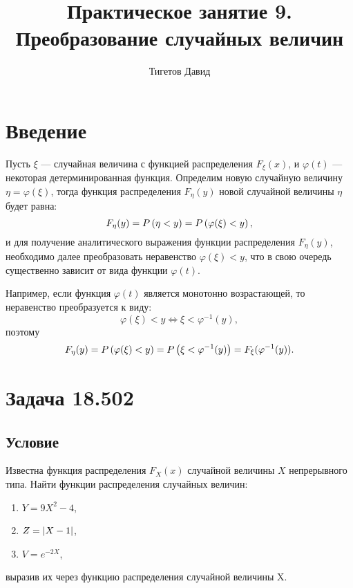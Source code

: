 \documentclass[12pt,a4paper]{article}
\begin{document}
    \title{Практическое занятие 9. \\ Преобразование случайных величин}
    \author{Тигетов Давид}
    \maketitle


    \section{Введение}
    Пусть $\xi$ --- случайная величина с функцией распределения $F_\xi(x)$, и $\varphi(t)$ --- некоторая детерминированная функция. Определим новую случайную величину
    $\eta = \varphi(\xi)$, тогда функция распределения $F_\eta(y)$ новой случайной величины $\eta$ будет равна:
    \begin{equation}
        F_\eta(y) = P \left ( \eta < y \right ) = P \left ( \varphi(\xi) < y \right ),
    \end{equation}
    и для получение аналитического выражения функции распределения $F_\eta(y)$, необходимо далее преобразовать неравенство $\varphi(\xi) < y$, что в свою очередь
    существенно зависит от вида функции $\varphi(t)$.

    Например, если функция $\varphi(t)$ является монотонно возрастающей, то неравенство преобразуется к виду:
    \begin{equation}
        \varphi(\xi) < y \Leftrightarrow \xi < \varphi^{-1}(y),
    \end{equation}
    поэтому
    \begin{equation}
        F_\eta(y) = P \left ( \varphi(\xi) < y \right ) = P \left ( \xi < \varphi^{-1}(y) \right ) = F_\xi (\varphi^{-1}(y)) .
    \end{equation}


    \section{Задача 18.502}

    \subsection*{Условие}
    Известна функция распределения $F_X(x)$ случайной величины $X$ непрерывного типа. Найти функции распределения случайных величин:
    \begin{enumerate}
        \item $Y = 9 X^2 - 4$,
        \item $Z = \left | X - 1 \right |$,
        \item $V = e^{-2X}$,
    \end{enumerate}
    выразив их через функцию распределения случайной величины X.
\end{document}
